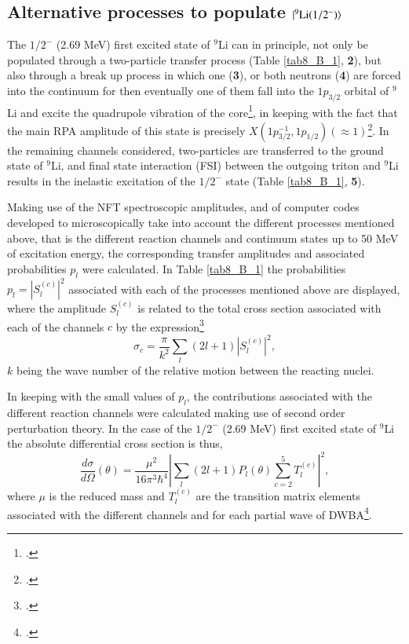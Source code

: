 \begin{subappendices}
\section{Alternative processes to populate $|{^9\text{Li}(1/2^-)} \rangle$}\label{C8AppB}
The $1/2^-$ (2.69 MeV) first excited state of $^9$Li can in principle, not only be populated through a two-particle transfer process (Table \ref{tab8_B_1}, \textbf{2}), but also through a break up process in which one (\textbf{3}), or both neutrons (\textbf{4}) are forced into the continuum for then eventually one of them fall into the $1p_{3/2}$ orbital of $^9$Li and excite the quadrupole vibration of the core\footnote{\cite{Potel:10}.}, in keeping with the fact that the main RPA amplitude of this state is precisely $X(1p^{-1}_{3/2},1p_{1/2})(\approx 1)$\footnote{\cite{Barranco:01}.}. In the remaining channels considered,  two-particles are transferred to the ground state of $^{9}$Li, and final state interaction (FSI) between the outgoing triton and $^{9}$Li results in the inelastic excitation of  the $1/2^-$ state (Table \ref{tab8_B_1}, \textbf{5}).


Making use of the NFT spectroscopic amplitudes, and of computer codes developed  to microscopically take into account   the different processes mentioned above, that is the different reaction channels and continuum states up to 50 MeV of excitation energy, the corresponding transfer amplitudes and associated probabilities $p_l$ were calculated.
 In Table \ref{tab8_B_1}  the probabilities $p_l=|S_l^{(c)}|^2$ associated with each of the processes mentioned above are displayed, where the amplitude $S_l^{(c)}$ is related to the total cross section associated with each of the channels $c$  by the expression\footnote{\cite{Satchler:80,Landau:81}.}
\begin{equation}\label{eq6B1}
    \sigma_c=\frac{\pi}{k^2}\sum_l(2l+1)|S_l^{(c)}|^2,
\end{equation}
$k$ being the wave number of the relative motion between the reacting nuclei.


 In keeping with the small values of $p_l$,  the  contributions associated with the different reaction channels were calculated making use of second order perturbation theory. In the case of the $1/2^-$ (2.69 MeV) first excited state of $^9$Li the absolute differential cross section is thus,
\begin{equation}
    \frac{d\sigma}{d\Omega}(\theta)=\frac{\mu^2}{16\pi^3\hbar^4}\left|\sum_l(2l+1)P_l(\theta)\sum_{c=2}^5 T^{(c)}_l\right|^2,
\end{equation}
where $\mu$ is the reduced mass and $T^{(c)}_l$ are the transition matrix elements associated with the different channels and for each partial wave of DWBA\footnote{\cite{Satchler:80}.}.


\end{subappendices}
